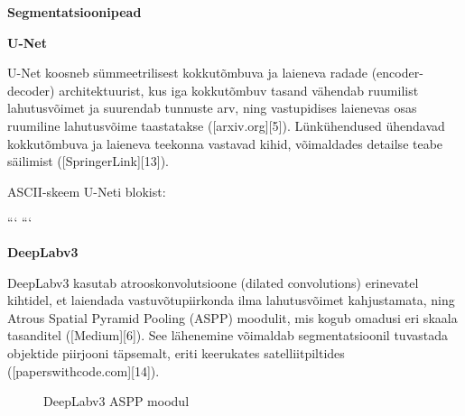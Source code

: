 \textbf{Segmentatsioonipead}

\textbf{U-Net}

U-Net koosneb sümmeetrilisest kokkutõmbuva ja laieneva radade (encoder-decoder) architektuurist, kus iga kokkutõmbuv tasand vähendab ruumilist lahutusvõimet ja suurendab tunnuste arv, ning vastupidises laienevas osas ruumiline lahutusvõime taastatakse ([arxiv.org][5]). Lünkühendused ühendavad kokkutõmbuva ja laieneva teekonna vastavad kihid, võimaldades detailse teabe säilimist ([SpringerLink][13]).

ASCII-skeem U-Neti blokist:

```
```

\textbf{DeepLabv3}

DeepLabv3 kasutab atrooskonvolutsioone (dilated convolutions) erinevatel kihtidel, et laiendada vastuvõtupiirkonda ilma lahutusvõimet kahjustamata, ning Atrous Spatial Pyramid Pooling (ASPP) moodulit, mis kogub omadusi eri skaala tasanditel ([Medium][6]). See lähenemine võimaldab segmentatsioonil tuvastada objektide piirjooni täpsemalt, eriti keerukates satelliitpiltides ([paperswithcode.com][14]).

\begin{figure}[!ht]
    \centering
    \caption{DeepLabv3 ASPP moodul}
    \label{fig:DeepLabv3ASPP}
\end{figure}


